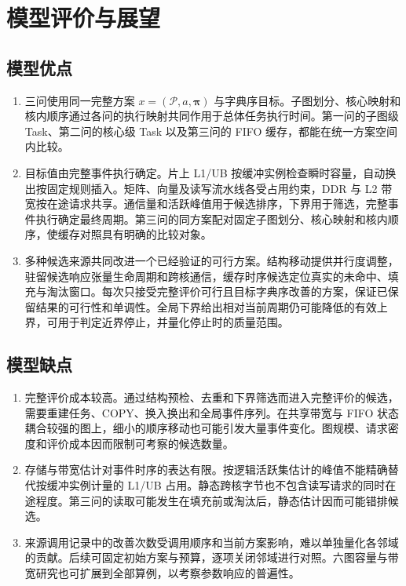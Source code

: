 \section{模型评价与展望}
\subsection{模型优点}
\begin{enumerate}
\item 三问使用同一完整方案 $x=(\mathcal P,a,\boldsymbol\pi)$ 与字典序目标。子图划分、核心映射和核内顺序通过各问的执行映射共同作用于总体任务执行时间。第一问的子图级 Task、第二问的核心级 Task 以及第三问的 FIFO 缓存，都能在统一方案空间内比较。

\item 目标值由完整事件执行确定。片上 L1/UB 按缓冲实例检查瞬时容量，自动换出按固定规则插入。矩阵、向量及读写流水线各受占用约束，DDR 与 L2 带宽按在途请求共享。通信量和活跃峰值用于候选排序，下界用于筛选，完整事件执行确定最终周期。第三问的同方案配对固定子图划分、核心映射和核内顺序，使缓存对照具有明确的比较对象。

\item 多种候选来源共同改进一个已经验证的可行方案。结构移动提供并行度调整，驻留候选响应张量生命周期和跨核通信，缓存时序候选定位真实的未命中、填充与淘汰窗口。每次只接受完整评价可行且目标字典序改善的方案，保证已保留结果的可行性和单调性。全局下界给出相对当前周期仍可能降低的有效上界，可用于判定近界停止，并量化停止时的质量范围。
\end{enumerate}

\subsection{模型缺点}
\begin{enumerate}
\item 完整评价成本较高。通过结构预检、去重和下界筛选而进入完整评价的候选，需要重建任务、COPY、换入换出和全局事件序列。在共享带宽与 FIFO 状态耦合较强的图上，细小的顺序移动也可能引发大量事件变化。图规模、请求密度和评价成本因而限制可考察的候选数量。

\item 存储与带宽估计对事件时序的表达有限。按逻辑活跃集估计的峰值不能精确替代按缓冲实例计量的 L1/UB 占用。静态跨核字节也不包含读写请求的同时在途程度。第三问的读取可能发生在填充前或淘汰后，静态估计因而可能错排候选。

\item 来源调用记录中的改善次数受调用顺序和当前方案影响，难以单独量化各邻域的贡献。后续可固定初始方案与预算，逐项关闭邻域进行对照。六图容量与带宽研究也可扩展到全部算例，以考察参数响应的普遍性。
\end{enumerate}

